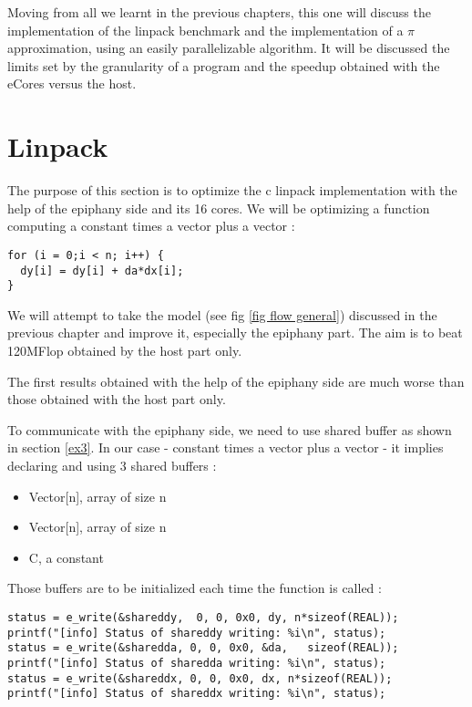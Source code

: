 Moving from all we learnt in the previous chapters, this one will discuss the implementation of the linpack benchmark and the implementation of a $\pi$ approximation, using an easily parallelizable algorithm. It will be discussed the limits set by the granularity of a program and the speedup obtained with the \glspl{eCore} versus the host.

\section{Linpack}

The purpose of this section is to optimize the c linpack implementation with the help of the \gls{epiphany} side and its 16 cores. We will be optimizing a function computing a constant times a vector plus a vector :
\begin{lstlisting}
for (i = 0;i < n; i++) {
  dy[i] = dy[i] + da*dx[i];
}
\end{lstlisting}

We will attempt to take the model (see fig \ref{fig flow general}) discussed in the previous chapter and improve it, especially the \gls{epiphany} part. The aim is to beat 120MFlop obtained by the host part only.

The first results obtained with the help of the \gls{epiphany} side are much worse than those obtained with the host part only.

To communicate with the \gls{epiphany} side, we need to use shared buffer as shown in section \ref{ex3}. In our case - constant times a vector plus a vector - it implies declaring and using 3 shared buffers :

\begin{itemize}
  \item Vector[n], array of size n
  \item Vector[n], array of size n
  \item C, a constant
\end{itemize}

Those buffers are to be initialized each time the function is called :

\begin{lstlisting}
status = e_write(&shareddy,  0, 0, 0x0, dy, n*sizeof(REAL));
printf("[info] Status of shareddy writing: %i\n", status);
status = e_write(&sharedda, 0, 0, 0x0, &da,   sizeof(REAL));
printf("[info] Status of sharedda writing: %i\n", status);
status = e_write(&shareddx, 0, 0, 0x0, dx, n*sizeof(REAL));
printf("[info] Status of shareddx writing: %i\n", status);
\end{lstlisting}


